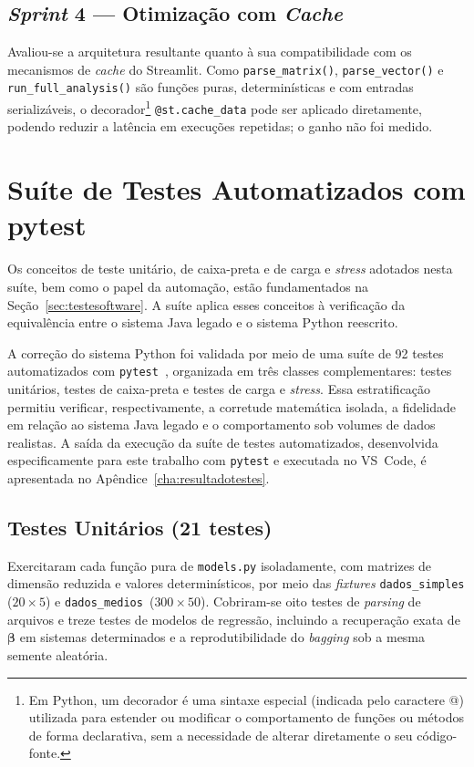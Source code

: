 \subsection{\textit{Sprint} 4 --- Otimização com \textit{Cache}}
Avaliou-se a arquitetura resultante quanto à sua compatibilidade com os mecanismos de
\textit{cache} do Streamlit. Como \texttt{parse\_matrix()}, \texttt{parse\_vector()}
e \texttt{run\_full\_analysis()} são funções puras, determinísticas e com
entradas serializáveis, o decorador\footnote{Em Python, um decorador é uma sintaxe especial (indicada pelo caractere @) utilizada para estender ou modificar o comportamento de funções ou métodos de forma declarativa, sem a necessidade de alterar diretamente o seu código-fonte.} \texttt{@st.cache\_data} pode ser aplicado diretamente, podendo reduzir a latência em execuções repetidas; o ganho não foi medido.

\section{Suíte de Testes Automatizados com pytest}
\label{sec:testescaixapreta}
Os conceitos de teste unitário, de caixa-preta e de carga e \textit{stress}
adotados nesta suíte, bem como o papel da automação, estão fundamentados na
Seção~\ref{sec:testesoftware}. A suíte aplica esses conceitos à verificação
da equivalência entre o sistema Java legado e o sistema Python reescrito.

A correção do sistema Python foi validada por meio de uma suíte de 92 testes
automatizados com \texttt{pytest}~\cite{pytest2024}, organizada em três classes
complementares: testes unitários, testes de caixa-preta e testes de carga e
\textit{stress}. Essa estratificação permitiu verificar, respectivamente, a
corretude matemática isolada, a fidelidade em relação ao sistema Java legado e
o comportamento sob volumes de dados realistas. A saída da execução da suíte de testes automatizados, desenvolvida especificamente para este trabalho com \texttt{pytest} e executada no VS~Code, é apresentada no Apêndice~\ref{cha:resultadotestes}.

\subsection{Testes Unitários (21 testes)}
Exercitaram cada função pura de \texttt{models.py} isoladamente, com matrizes de dimensão reduzida e valores
determinísticos, por meio das \textit{fixtures} \texttt{dados\_simples}
($20\times5$) e \texttt{dados\_medios}~($300\times50$). Cobriram-se oito testes
de \textit{parsing} de arquivos e treze testes de modelos de regressão,
incluindo a recuperação exata de $\boldsymbol{\beta}$ em sistemas determinados
e a reprodutibilidade do \textit{bagging} sob a mesma semente aleatória.

